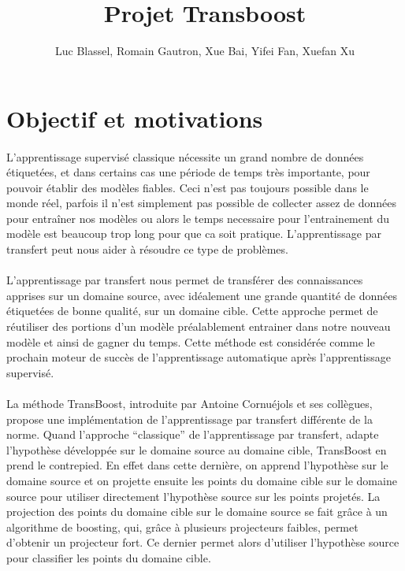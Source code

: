 \documentclass[11 pt]{article}
\title{Projet Transboost}
\author{Luc Blassel, Romain Gautron, Xue Bai, Yifei Fan, Xuefan Xu}
\begin{document}
\maketitle

\tableofcontents
\newpage

\section{Objectif et motivations}
\paragraph{}L’apprentissage supervisé  classique nécessite un grand nombre de données étiquetées, et dans certains cas une période de temps très importante, pour pouvoir établir des modèles fiables. Ceci n’est pas toujours possible dans le monde réel, parfois il n’est simplement pas possible de collecter assez de données pour entraîner nos modèles ou alors le temps necessaire pour l’entrainement du modèle est beaucoup trop long pour que ca soit pratique.  L’apprentissage par transfert peut nous aider à résoudre ce type de problèmes.

\paragraph{}L’apprentissage par transfert nous permet de transférer des connaissances apprises sur un domaine source, avec idéalement une grande quantité de données étiquetées de bonne qualité, sur un domaine cible. Cette approche permet de réutiliser des portions d’un modèle préalablement entrainer dans notre nouveau modèle et ainsi de gagner du temps. Cette méthode est considérée comme le prochain moteur de succès de l’apprentissage automatique après l’apprentissage supervisé.

\paragraph{}La méthode TransBoost, introduite par Antoine Cornuéjols et ses collègues, propose une implémentation de l’apprentissage par transfert différente de la norme.  Quand l’approche “classique” de l’apprentissage par transfert, adapte l'hypothèse développée sur le domaine source au domaine cible, TransBoost en prend le contrepied. En effet dans cette dernière, on apprend l'hypothèse sur le domaine source et on projette ensuite les points du domaine cible sur le domaine source pour utiliser directement l'hypothèse source sur les points projetés. La projection des points du domaine cible sur le domaine source se fait grâce à un algorithme de boosting, qui, grâce à plusieurs projecteurs faibles, permet d’obtenir un projecteur fort. Ce dernier permet alors d’utiliser l'hypothèse source pour classifier les points du domaine cible.
\end{document}
